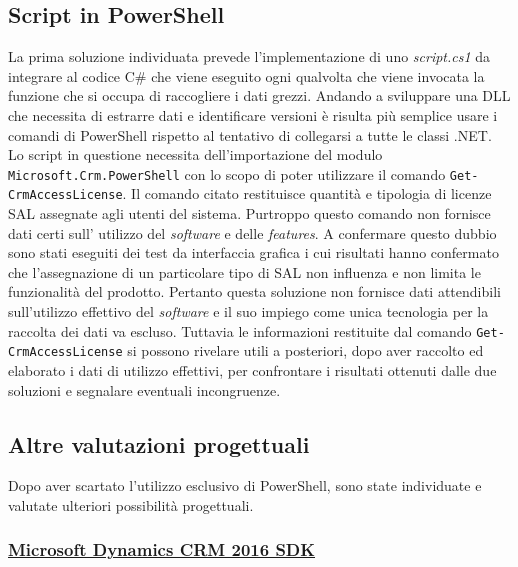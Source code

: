 \subsection{Script in PowerShell}
La prima soluzione individuata prevede l’implementazione di uno \emph{script.cs1} da integrare al codice C\# che viene eseguito ogni qualvolta che viene invocata la funzione che si occupa di raccogliere i dati grezzi.
Andando a sviluppare una DLL che necessita di estrarre dati e identificare versioni è risulta più semplice usare i comandi di PowerShell rispetto al tentativo di collegarsi a tutte le classi .NET.
Lo script in questione necessita dell’importazione del modulo 
\texttt{Microsoft.Crm.PowerShell} con lo scopo di poter utilizzare il comando
\texttt{Get-CrmAccessLicense}. Il comando citato restituisce quantità
e tipologia di licenze SAL assegnate agli utenti del sistema.
Purtroppo questo comando non fornisce dati certi sull’ utilizzo del \emph{software} e delle \emph{features}.
A confermare questo dubbio sono stati eseguiti dei test da interfaccia grafica i cui risultati hanno confermato che l'assegnazione di un particolare tipo di SAL non influenza e non limita le funzionalità del prodotto.
Pertanto questa soluzione non fornisce dati attendibili sull'utilizzo effettivo del \emph{software} e il suo impiego come unica tecnologia per la raccolta dei dati va escluso.
Tuttavia le informazioni restituite dal comando \texttt{Get-CrmAccessLicense} si possono rivelare utili a posteriori, dopo aver raccolto ed elaborato i dati di utilizzo effettivi, per confrontare i risultati ottenuti dalle due soluzioni e segnalare eventuali incongruenze.
\subsection{Altre valutazioni progettuali}
Dopo aver scartato l’utilizzo esclusivo di PowerShell, sono state individuate e valutate ulteriori possibilità progettuali.
\subsubsection{\underline{Microsoft Dynamics CRM 2016 SDK}}

